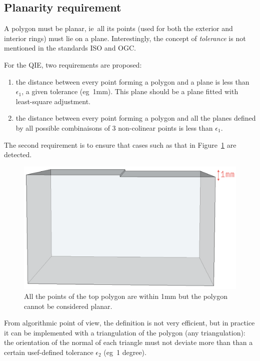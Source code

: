 \documentclass[a4paper,parskip=half,11pt]{scrartcl}
\newcommand{\ie}{ie}
\newcommand{\eg}{eg}
\begin{document}
\subsection{Planarity requirement}

A polygon must be planar, \ie\ all its points (used for both the exterior and interior rings) must lie on a plane.
Interestingly, the concept of \emph{tolerance} is not mentioned in the standards ISO and OGC\@.

For the QIE, two requirements are proposed:
\begin{enumerate}
  \item the distance between every point forming a polygon and a plane is less than $\epsilon_1$, a given tolerance (\eg\ 1mm).
  This plane should be a plane fitted with least-square adjustment.
  \item the distance between every point forming a polygon and all the planes defined by all possible combinaisons of 3 non-colinear points is less than $\epsilon_1$.
\end{enumerate}

The second requirement is to ensure that cases such as that in Figure~\ref{fig:planarity_fold} are detected.
\begin{figure}
  \centering
  \includegraphics[width=0.45\linewidth]{figs/planarity_fold}
  \caption{All the points of the top polygon are within 1mm but the polygon cannot be considered planar.}
\label{fig:planarity_fold}
\end{figure}
From algorithmic point of view, the definition is not very efficient, but in practice it can be implemented with a triangulation of the polygon (any triangulation): the orientation of the normal of each triangle must not deviate more than than a certain usef-defined tolerance $\epsilon_2$ (\eg\ 1 degree).


\end{document}
